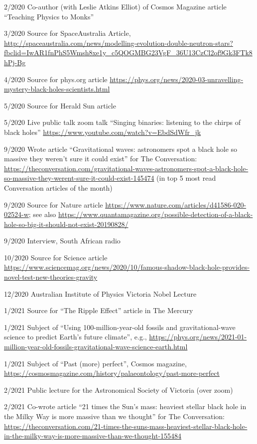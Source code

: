 \documentclass[margin,line]{res}
\begin{document}
\begin{resume}
2/2020	Co-author (with Leslie Atkins Elliot) of Cosmos Magazine article ``Teaching Physics to Monks''
	
3/2020 	Source for SpaceAustralia Article, \url{http://spaceaustralia.com/news/modelling-evolution-double-neutron-stars?fbclid=IwAR1fnPhS5Wmsh8xe1y_c5QOGMBG23VgF_36U13CzCl2of9Gk3FTk8hPj-Bg}
	  
4/2020	Source for phys.org article \url{https://phys.org/news/2020-03-unravelling-mystery-black-holes-scientists.html}

5/2020	Source for Herald Sun article

5/2020	Live public talk zoom talk ``Singing binaries: listening to the chirps of black holes'' \url{https://www.youtube.com/watch?v=EbdSdWfr_jk}

9/2020	Wrote article ``Gravitational waves: astronomers spot a black hole so massive they weren't sure it could exist'' for The Conversation: \url{https://theconversation.com/gravitational-waves-astronomers-spot-a-black-hole-so-massive-they-werent-sure-it-could-exist-145474} (in top 5 most read Conversation articles of the month)

9/2020	Source for Nature article \url{https://www.nature.com/articles/d41586-020-02524-w}; see also \url{https://www.quantamagazine.org/possible-detection-of-a-black-hole-so-big-it-should-not-exist-20190828/}

9/2020	Interview, South African radio

10/2020	Source for Science article \url{https://www.sciencemag.org/news/2020/10/famous-shadow-black-hole-provides-novel-test-new-theories-gravity}
	  
12/2020	Australian Institute of Physics Victoria Nobel Lecture

1/2021	Source for ``The Ripple Effect'' article in The Mercury

1/2021 	Subject of ``Using 100-million-year-old fossils and gravitational-wave science to predict Earth's future climate'', e.g., \url{https://phys.org/news/2021-01-million-year-old-fossils-gravitational-wave-science-earth.html}

1/2021	Subject of ``Past (more) perfect'', Cosmos magazine, \url{https://cosmosmagazine.com/history/palaeontology/past-more-perfect}

2/2021 	Public lecture for the Astronomical Society of Victoria (over zoom)

2/2021 	Co-wrote article ``21 times the Sun's mass: heaviest stellar black hole in the Milky Way is more massive than we thought'' for The Conversation: \url{https://theconversation.com/21-times-the-suns-mass-heaviest-stellar-black-hole-in-the-milky-way-is-more-massive-than-we-thought-155484}


\end{resume}
\end{document}
